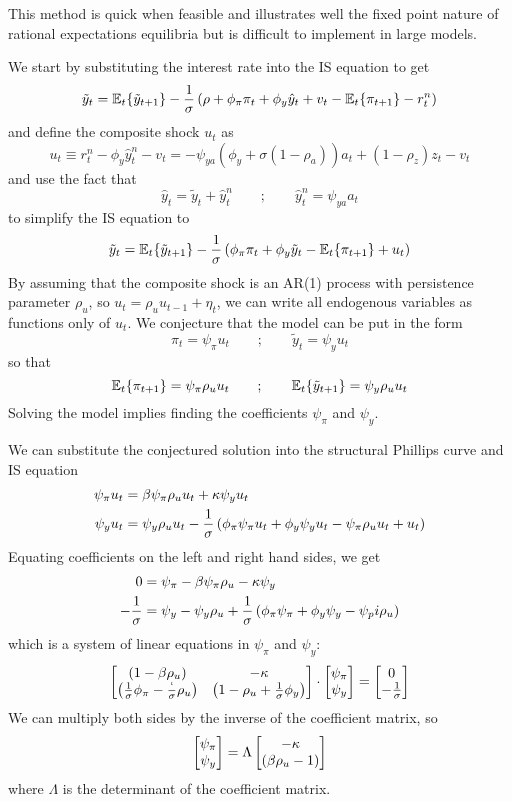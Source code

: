 \documentclass[10pt]{article}
\begin{document}
\begin{example}

\begin{remark}
	This method is quick when feasible and illustrates well the fixed point nature of rational expectations equilibria but is difficult to implement in large models.
\end{remark}
We start by substituting the interest rate into the IS equation to get \[\tilde{y}_t = \mathbb{E}_t \{\tilde{y}_{t+1}\} - \frac{1}{\sigma} \left( \rho + \phi_\pi \pi_t + \phi_y \hat{y}_t + v_t - \mathbb{E}_t\{\pi_{t+1}\} - r_t^n\right)\]and define the composite shock $u_t$ as\[u_t \equiv r_t^n - \phi_y \hat{y}_t^n - v_t = -\psi_{ya}(\phi_y + \sigma(1-\rho_a))a_t + (1-\rho_z)z_t - v_t\]and use the fact that \[\hat{y}_t = \tilde{y}_t + \hat{y}_t^n \qquad ; \qquad \hat{y}_t^n = \psi_{ya}a_t\]to simplify the IS equation to \[\tilde{y}_t = \mathbb{E}_t \{\tilde{y}_{t+1}\} - \frac{1}{\sigma} \left( \phi_\pi \pi_t + \phi_y \tilde{y}_t - \mathbb{E}_t\{\pi_{t+1}\} + u_t\right)\]By assuming that the composite shock is an AR(1) process with persistence parameter $\rho_u$, so $u_t = \rho_u u_{t-1} + \eta_t$, we can write all endogenous variables as functions only of $u_t$. We conjecture that the model can be put in the form \[\pi_t = \psi_\pi u_t \qquad ;\qquad \tilde{y}_t = \psi_y u_t \]so that \[\mathbb{E}_t \{\pi_{t+1}\} = \psi_\pi \rho_u u_t \qquad ; \qquad \mathbb{E}_t \{\tilde{y}_{t+1}\} = \psi_y \rho_u u_t\]Solving the model implies finding the coefficients $\psi_\pi$ and $\psi_y$.

We can substitute the conjectured solution into the structural Phillips curve and IS equation \begin{align*} \psi_\pi u_t &= \beta \psi_\pi \rho_u u_t + \kappa \psi_y u_t \\ \psi_y u_t &= \psi_y \rho_u u_t - \frac{1}{\sigma} \left( \phi_\pi \psi_\pi u_t + \phi_y\psi_y u_t - \psi_\pi \rho_u u_t + u_t\right)\end{align*}Equating coefficients on the left and right hand sides, we get
\begin{align*}
	0 &= \psi_\pi - \beta \psi_\pi \rho_u - \kappa \psi_y \\
	-\frac{1}{\sigma} &= \psi_y - \psi_y \rho_u + \frac{1}{\sigma} \left( \phi_\pi\psi_\pi + \phi_y\psi_y - \psi_pi\rho_u\right)
\end{align*}
which is a system of linear equations in $\psi_\pi$ and $\psi_y$:
\[
\begin{bmatrix}(1-\beta\rho_u) & -\kappa \\ \left( \frac{1}{\sigma} \phi_\pi - \frac{`}{\sigma} \rho_u\right) & \left( 1 - \rho_u + \frac{1}{\sigma} \phi_y\right)\end{bmatrix} \cdot \begin{bmatrix}\psi_\pi \\ \psi_y\end{bmatrix} = \begin{bmatrix}0 \\ -\frac{1}{\sigma}\end{bmatrix}\]
We can multiply both sides by the inverse of the coefficient matrix, so 
\[
\begin{bmatrix}\psi_\pi \\ \psi_y\end{bmatrix} = \Lambda \begin{bmatrix}-\kappa \\ (\beta \rho_u - 1)\end{bmatrix}
\]
where $\Lambda$ is the determinant of the coefficient matrix.
\end{example}
\end{document}
